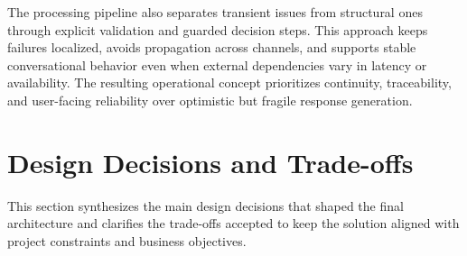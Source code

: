 The processing pipeline also separates transient issues from structural ones through explicit validation and guarded decision steps. This approach keeps failures localized, avoids propagation across channels, and supports stable conversational behavior even when external dependencies vary in latency or availability. The resulting operational concept prioritizes continuity, traceability, and user-facing reliability over optimistic but fragile response generation.

\section{Design Decisions and Trade-offs}
This section synthesizes the main design decisions that shaped the final architecture and clarifies the trade-offs accepted to keep the solution aligned with project constraints and business objectives.

